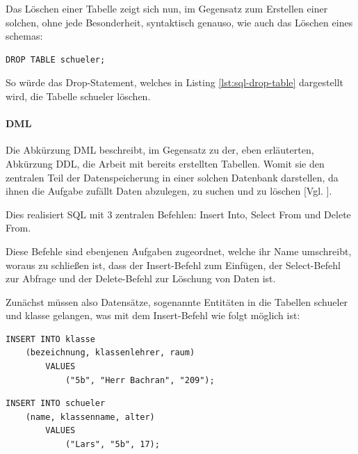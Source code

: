 \documentclass[12pt,a4paper,bibliography=totocnumbered,listof=totocnumbered]{scrartcl}
\begin{document}
\begin{minipage}{\linewidth}
Das Löschen einer Tabelle zeigt sich nun, im Gegensatz zum Erstellen einer solchen, ohne jede Besonderheit, syntaktisch genauso, wie auch das Löschen eines \glqq schemas\grqq{}:
\\
\vspace{1em}
\begin{lstlisting}[caption= SQL Drop Table, label=lst:sql-drop-table]
DROP TABLE schueler;
\end{lstlisting}
So würde das \glqq Drop-Statement\grqq{}, welches in Listing \ref{lst:sql-drop-table} dargestellt wird, die Tabelle \glqq schueler\grqq{} löschen.

\paragraph{DML}

Die Abkürzung DML beschreibt, im Gegensatz zu der, eben erläuterten, Abkürzung DDL, die Arbeit mit bereits erstellten Tabellen.
Womit sie den zentralen Teil der Datenspeicherung in einer solchen Datenbank darstellen, da ihnen die Aufgabe zufällt Daten abzulegen, zu suchen und zu löschen [Vgl. \cite{wiki/SQL}].

Dies realisiert SQL mit 3 zentralen Befehlen:
\glqq Insert Into\grqq, \glqq Select From\grqq{} und \glqq Delete From\grqq.

Diese Befehle sind ebenjenen Aufgaben zugeordnet, welche ihr Name umschreibt, woraus zu schließen ist, dass der \glqq Insert-Befehl\grqq{} zum Einfügen, der \glqq Select-Befehl\grqq{} zur Abfrage und der \glqq Delete-Befehl\grqq{} zur Löschung von Daten ist.

Zunächst müssen also Datensätze, sogenannte \glqq Entitäten\grqq{} in die Tabellen \glqq schueler\grqq{} und \glqq klasse\grqq{} gelangen, was mit dem \glqq Insert-Befehl\grqq{} wie folgt möglich ist:
\\
\vspace{1em}
\begin{lstlisting}[caption= SQL Insert Into Table, label=lst:sql-insert-into-table]
INSERT INTO klasse
	(bezeichnung, klassenlehrer, raum)
		VALUES
			("5b", "Herr Bachran", "209");
\end{lstlisting}
 


\vspace{1em}
\begin{lstlisting}[caption= SQL Insert Into Table 2, label=lst:sql-insert-into-table2]
INSERT INTO schueler
	(name, klassenname, alter)
		VALUES
			("Lars", "5b", 17);
\end{lstlisting}
 

\end{minipage}
\end{document}
